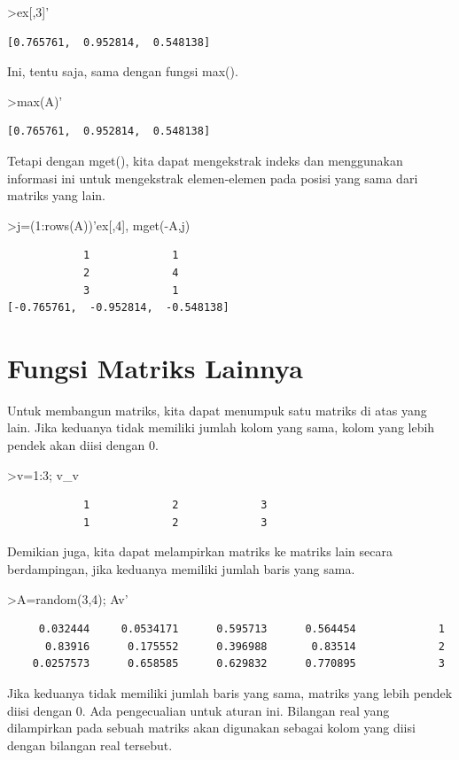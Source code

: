 \documentclass[
]{book}
\begin{document}
\textgreater ex{[},3{]}'

\begin{verbatim}
[0.765761,  0.952814,  0.548138]
\end{verbatim}

Ini, tentu saja, sama dengan fungsi max().

\textgreater max(A)'

\begin{verbatim}
[0.765761,  0.952814,  0.548138]
\end{verbatim}

Tetapi dengan mget(), kita dapat mengekstrak indeks dan menggunakan informasi ini untuk mengekstrak elemen-elemen pada posisi yang sama dari matriks yang lain.

\textgreater j=(1:rows(A))'\textbar ex{[},4{]}, mget(-A,j)

\begin{verbatim}
            1             1 
            2             4 
            3             1 
[-0.765761,  -0.952814,  -0.548138]
\end{verbatim}

\section{Fungsi Matriks Lainnya}\label{fungsi-matriks-lainnya}

Untuk membangun matriks, kita dapat menumpuk satu matriks di atas yang lain. Jika keduanya tidak memiliki jumlah kolom yang sama, kolom yang lebih pendek akan diisi dengan 0.

\textgreater v=1:3; v\_v

\begin{verbatim}
            1             2             3 
            1             2             3 
\end{verbatim}

Demikian juga, kita dapat melampirkan matriks ke matriks lain secara berdampingan, jika keduanya memiliki jumlah baris yang sama.

\textgreater A=random(3,4); A\textbar v'

\begin{verbatim}
     0.032444     0.0534171      0.595713      0.564454             1 
      0.83916      0.175552      0.396988       0.83514             2 
    0.0257573      0.658585      0.629832      0.770895             3 
\end{verbatim}

Jika keduanya tidak memiliki jumlah baris yang sama, matriks yang lebih pendek diisi dengan 0. Ada pengecualian untuk aturan ini. Bilangan real yang dilampirkan pada sebuah matriks akan digunakan sebagai kolom yang diisi dengan bilangan real tersebut.
\end{document}
